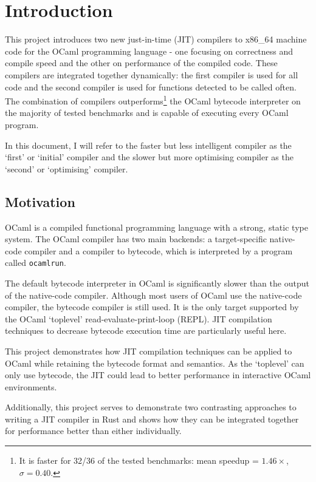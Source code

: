 \chapter{Introduction}

This project introduces two new just-in-time (JIT) compilers to x86\_64 machine code for the OCaml
programming language - one focusing on correctness and compile speed and the other on performance
of the compiled code. These compilers are integrated together dynamically: the first compiler is
used for all code and the second compiler is used for functions detected to be called often.  The
combination of compilers outperforms\footnote{It is faster for 32/36 of the tested benchmarks:
    mean speedup = $1.46\times$, $\sigma = 0.40$.} the OCaml bytecode interpreter on the majority
of
tested benchmarks and is capable of executing every OCaml program.

In this document, I will refer to the faster but less intelligent compiler as the `first' or
`initial' compiler and the slower but more optimising compiler as the `second' or `optimising'
compiler.

\section{Motivation}

OCaml is a compiled functional programming language with a strong, static type system. The OCaml
compiler has two main backends: a target-specific native-code compiler and a compiler to
bytecode, which is interpreted by a program called \texttt{ocamlrun}.

The default bytecode interpreter in OCaml is significantly slower than the output of the
native-code compiler. Although most users of OCaml use the native-code compiler, the bytecode
compiler is
still used. It is the only target supported by the OCaml `toplevel' read-evaluate-print-loop
(REPL).
JIT compilation techniques to decrease bytecode execution time are particularly useful here.

This project demonstrates how JIT compilation techniques can be applied to OCaml while retaining
the bytecode format and semantics. As the `toplevel' can only use
bytecode, the JIT could lead to better performance in interactive OCaml environments.

Additionally, this project serves to demonstrate two contrasting approaches to writing a JIT
compiler in Rust and shows how they can be integrated together for performance better than
either individually.

